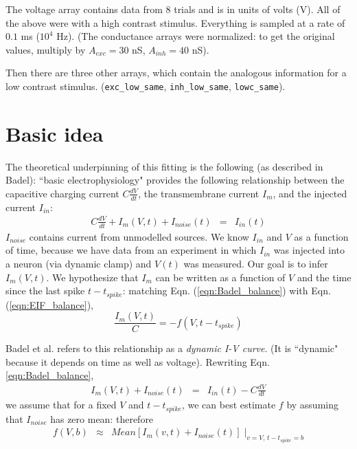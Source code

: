 \documentclass[11pt]{article}
\begin{document}
The voltage array contains data from 8 trials and is in units of volts (V).
All of the above were with a high contrast stimulus. Everything is sampled at a rate of $0.1$ ms ($10^4$ Hz).
(The conductance arrays were normalized: to get the original values, multiply by $A_{exc} = 30$ nS, $A_{inh} = 40$ nS).

Then there are three other arrays, which contain the analogous information for a low contrast stimulus.
(\texttt{exc\_low\_same}, \texttt{inh\_low\_same}, \texttt{lowc\_same}).
 
\section{Basic idea}
The theoretical underpinning of this fitting is the following (as described in Badel): 
``basic electrophysiology" provides the following relationship between the capacitive charging current $C \frac{dV}{dt}$, the transmembrane current $I_m$, and the injected current $I_{in}$:
\begin{eqnarray}
C \frac{dV}{dt} + I_m(V, t) + I_{noise}(t) & = & I_{in}(t)   \label{eqn:Badel_balance}
\end{eqnarray}
$I_{noise}$ contains current from unmodelled sources. 
We know $I_{in}$ and $V$ as a function of time, because we have data from an experiment in which $I_{in}$ was injected into a neuron (via dynamic clamp) and $V(t)$ was measured. Our goal is to infer $I_m(V,t)$. We hypothesize that $I_m$ can be written as a function of $V$ and the time since the last spike $t-t_{spike}$: matching Eqn.  (\ref{eqn:Badel_balance}) with Eqn.  (\ref{eqn:EIF_balance}),
\[ \frac{I_m(V,t)}{C}  =  -f(V, t-t_{spike})
\]

Badel et al. refers to this relationship as a \textit{dynamic I-V curve}. (It is ``dynamic" because it depends on time as well as voltage). Rewriting Eqn. \ref{eqn:Badel_balance},
\begin{eqnarray}
I_m(V, t) + I_{noise}(t) & = & I_{in}(t) - C \frac{dV}{dt}   \label{known_vs_unknown}
\end{eqnarray}
we assume that for a fixed $V$ and $t-t_{spike}$, we can best estimate $f$ by assuming that $I_{noise}$ has zero mean: therefore
\begin{eqnarray}
f(V, b) & \approx & Mean[I_m(v, t) + I_{noise}(t) ] \; \bigg|_{v = V, \, t-t_{spike}=b}
\end{eqnarray}
\end{document}

